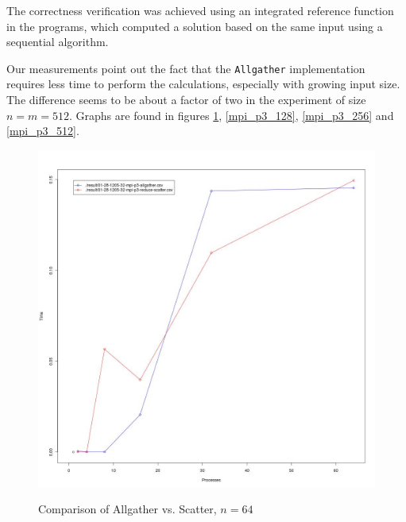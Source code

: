 \documentclass[12pt]{article}
\begin{document}
The correctness verification was achieved using an integrated reference function in the programs, which computed a solution based on the same input using a sequential algorithm. 

Our measurements point out the fact that the \verb=Allgather= implementation requires less time to perform the calculations, especially with growing input size. The difference seems to be about a factor of two in the experiment of size $n = m = 512$. Graphs are found in figures \ref{mpi_p3_64}, \ref{mpi_p3_128}, \ref{mpi_p3_256} and \ref{mpi_p3_512}.


\begin{figure}[H]
\centering
\caption{Comparison of Allgather vs. Scatter, $n=64$}
\includegraphics[scale=0.3]{candidate-graphs/mpi_p3_64.jpg}
\label{mpi_p3_64}
\end{figure}
\end{document}
